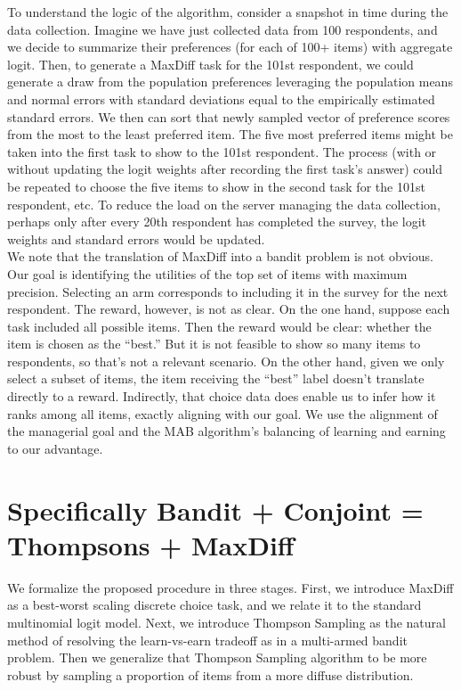 \documentclass[nonblindrev]{informs3}
\begin{document}
To understand the logic of the algorithm, consider a snapshot in time during the data collection. Imagine we have just collected data from 100 respondents, and we decide to summarize their preferences (for each of 100+ items) with aggregate logit.  Then, to generate a MaxDiff task for the 101st respondent, we could generate a draw from the population preferences leveraging the population means and normal errors with standard deviations equal to the empirically estimated standard errors.  We then can sort that newly sampled vector of preference scores from the most to the least preferred item.  The five most preferred items might be taken into the first task to show to the 101st respondent.  The process (with or without updating the logit weights after recording the first task's answer) could be repeated to choose the five items to show in the second task for the 101st respondent, etc.  To reduce the load on the server managing the data collection, perhaps only after every 20th respondent has completed the survey, the logit weights and standard errors would be updated.\\
We note that the translation of MaxDiff into a bandit problem is not obvious. Our goal is identifying the utilities of the top set of items with maximum precision. Selecting an arm corresponds to including it in the survey for the next respondent. The reward, however, is not as clear. On the one hand, suppose each task included all possible items. Then the reward would be clear: whether the item is chosen as the ``best.'' But it is not feasible to show so many items to respondents, so that's not a relevant scenario. On the other hand, given we only select a subset of items, the item receiving the ``best'' label doesn't translate directly to a reward. Indirectly, that choice data does enable us to infer how it ranks among all items, exactly aligning with our goal. We use the alignment of the managerial goal and the MAB algorithm's balancing of learning and earning to our advantage. \\
\section{Specifically Bandit + Conjoint = Thompsons + MaxDiff}
We formalize the proposed procedure in three stages. First, we introduce MaxDiff as a best-worst scaling discrete choice task, and we relate it to the standard multinomial logit model. Next, we introduce Thompson Sampling as the natural method of resolving the learn-vs-earn tradeoff as in a multi-armed bandit problem.  Then we generalize that Thompson Sampling algorithm to be more robust by sampling a proportion of items from a more diffuse distribution.
\end{document}

